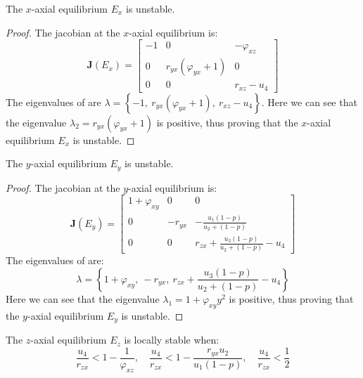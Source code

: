 \begin{theorem}\label{thm:axial-x-stability}
    The $x$-axial equilibrium $E_x$ is unstable.
\end{theorem}
\begin{proof}
    The jacobian at the $x$-axial equilibrium is:
    \begin{equation}\label{matrix:jacobian-axial-x}
        \textbf{J}\left(E_x\right) = \begin{bmatrix}
            -1 & 0 & -\varphi_{xz}\\
            0 & r_{yx}\left(\varphi_{yx}+1\right) & 0\\
            0 & 0 & r_{xz}-u_4
        \end{bmatrix}
    \end{equation}
    The eigenvalues of  are $\lambda=\left\{-1,\ r_{yx}\left(\varphi_{yx}+1\right),\ r_{xz}-u_4\right\}$.
    Here we can see that the eigenvalue $\lambda_2=r_{yx}\left(\varphi_{yx}+1\right)$ is positive, thus proving that the $x$-axial equilibrium $E_x$ is unstable.
\end{proof}
\begin{theorem}\label{thm:axial-y-stability}
    The $y$-axial equilibrium $E_y$ is unstable.
\end{theorem}
\begin{proof}
    The jacobian at the $y$-axial equilibrium is:
    \begin{equation}\label{matrix:jacobian-axial-y}
        \textbf{J}\left(E_y\right) = \begin{bmatrix}
            1+\varphi_{xy} & 0 & 0\\
            0 & -r_{yx} & -\frac{u_1\left(1-p\right)}{u_2+\left(1-p\right)}\\
            0 & 0 & r_{zx}+\frac{u_3\left(1-p\right)}{u_2+\left(1-p\right)}-u_4
        \end{bmatrix}
    \end{equation}
    The eigenvalues of  are:
    \begin{equation*}
        \lambda=\left\{1+\varphi_{xy},\ -r_{yx},\ r_{zx}+\frac{u_3\left(1-p\right)}{u_2+\left(1-p\right)}-u_4\right\}
    \end{equation*}
    Here we can see that the eigenvalue $\lambda_1=1+\varphi_{xy}y^2$ is positive, thus proving that the $y$-axial equilibrium $E_y$ is unstable.
\end{proof}
\begin{theorem}\label{thm:axial-z-stability}
    The $z$-axial equilibrium $E_z$ is locally stable when:
    \begin{equation*}
        \frac{u_4}{r_{zx}} < 1-\frac{1}{\varphi_{xz}},\quad
        \frac{u_4}{r_{zx}} < 1-\frac{r_{yx}u_2}{u_1\left(1-p\right)},\quad
        \frac{u_4}{r_{zx}} < \frac{1}{2}
    \end{equation*}
\end{theorem}
